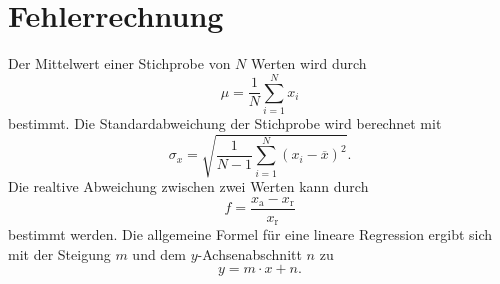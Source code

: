 \section{Fehlerrechnung}

Der Mittelwert einer Stichprobe von $N$ Werten wird durch
\begin{equation*}
    \mu = \frac{1}{N} \sum_{i=1}^N x_i
    \label{eqn:mittelwert}
\end{equation*}
bestimmt.
\newline
Die Standardabweichung der Stichprobe wird berechnet mit
\begin{equation*}
    \sigma_x = \sqrt{\frac{1}{N-1} \sum_{i=1}^N (x_i - \overline{x})^2}.
    \label{eqn:standard}
\end{equation*}
\newline
Die realtive Abweichung zwischen zwei Werten kann durch
\begin{equation*}
    f = \frac{x_\text{a} - x_\text{r}}{x_\text{r}}
\end{equation*}
bestimmt werden.
\newline 
Die allgemeine Formel für eine lineare Regression ergibt sich mit der Steigung $m$ und dem $y$-Achsenabschnitt $n$ zu 
\begin{equation}
    y = m \cdot x + n.
    \label{linReg}
\end{equation}
